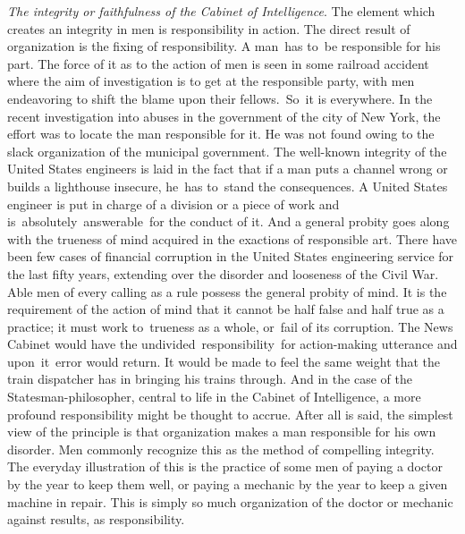 \documentclass[twoside,symmetric,nobib,justified]{tufte-book}
\begin{document}
\emph{The integrity or faithfulness of the Cabinet of Intelligence}. The
element which creates an integrity in men is responsibility in action.
The direct result of organization is the fixing of responsibility. A
man~has to~be responsible for his part. The force of it as to the action
of men is seen in some railroad accident where the aim of investigation
is to get at the responsible party, with men endeavoring to shift the
blame upon their fellows.~So~it is everywhere. In the recent
investigation into abuses in the government of the city of New York, the
effort was to locate the man responsible for it. He was not found owing
to the slack organization of the municipal government. The well-known
integrity of the United States engineers is laid in the fact that if a
man puts a channel wrong or builds a lighthouse insecure, he~has
to~stand the consequences. A United States engineer is put in charge of
a division or a piece of work and is~absolutely~answerable~for the
conduct of it. And a general probity goes along with the trueness of
mind acquired in the exactions of responsible art. There have been few
cases of financial corruption in the United States engineering service
for the last fifty years, extending over the disorder and looseness of
the Civil War. Able men of every calling as a rule possess the general
probity of mind. It is the requirement of the action of mind that it
cannot be half false and half true as a practice; it must work
to~trueness as a whole, or~fail of its corruption. The News Cabinet
would have the undivided~responsibility~for action-making utterance and
upon~it~error would return. It would be made to feel the same weight
that the train dispatcher has in bringing his trains through. And in the
case of the Statesman-philosopher, central to life in the Cabinet of
Intelligence, a more profound responsibility might be thought to accrue.
After all is said, the simplest view of the principle is that
organization makes a man responsible for his own disorder. Men commonly
recognize this as the method of compelling integrity. The everyday
illustration of this is the practice of some men of paying a doctor by
the year to keep them well, or paying a mechanic by the year to keep a
given machine in repair. This is simply so much organization of the
doctor or mechanic against results, as responsibility.~
\end{document}
